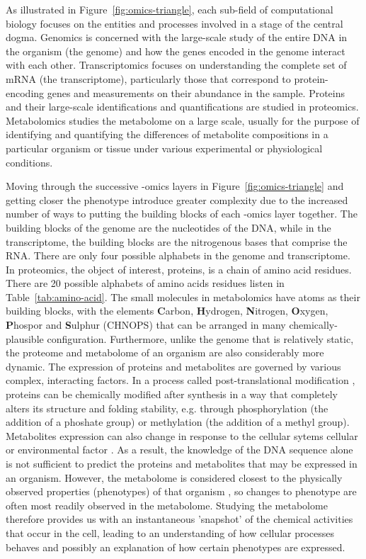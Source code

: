 As illustrated in Figure~\ref{fig:omics-triangle}, each sub-field of computational biology focuses on the entities and processes involved in a stage of the central dogma. Genomics is concerned with the large-scale study of the entire DNA in the organism (the genome) and how the genes encoded in the genome interact with each other. Transcriptomics focuses on understanding the complete set of mRNA (the transcriptome), particularly those that correspond to protein-encoding genes and measurements on their abundance in the sample. Proteins and their large-scale identifications and quantifications are studied in proteomics. Metabolomics studies the metabolome on a large scale, usually for the purpose of identifying and quantifying the differences of metabolite compositions in a particular organism or tissue under various experimental or physiological conditions. 

Moving through the successive -omics layers in Figure~\ref{fig:omics-triangle} and getting closer the phenotype introduce greater complexity due to the increased number of ways to putting the building blocks of each -omics layer together. The building blocks of the genome are the nucleotides of the DNA, while in the transcriptome, the building blocks are the nitrogenous bases that comprise the RNA. There are only four possible alphabets in the genome and transcriptome. In proteomics, the object of interest, proteins, is a chain of amino acid residues. There are 20 possible alphabets of amino acids residues listen in Table~\ref{tab:amino-acid}. The small molecules in metabolomics have atoms as their building blocks, with the elements \textbf{C}arbon, \textbf{H}ydrogen, \textbf{N}itrogen, \textbf{O}xygen, \textbf{P}hospor and \textbf{S}ulphur (CHNOPS) that can be arranged in many chemically-plausible configuration. Furthermore, unlike the genome that is relatively static, the proteome and metabolome of an organism are also considerably more dynamic. The expression of proteins and metabolites are governed by various complex, interacting factors. In a process called post-translational modification \cite{mann2003proteomic}, proteins can be chemically modified after synthesis in a way that completely alters its structure and folding stability, e.g. through phosphorylation (the addition of a phoshate group) or methylation (the addition of a methyl group). Metabolites expression can also change in response to the cellular sytems cellular \cite{Panopoulos2012} or environmental factor \cite{Hirai2004}. As a result, the knowledge of the DNA sequence alone is not sufficient to predict the proteins and metabolites that may be expressed in an organism. However, the metabolome is considered closest to the physically observed properties (phenotypes) of that organism \cite{Fiehn2002}, so changes to phenotype are often most readily observed in the metabolome. Studying the metabolome therefore provides us with an instantaneous 'snapshot' of the chemical activities that occur in the cell, leading to an understanding of how cellular processes behaves and possibly an explanation of how certain phenotypes are expressed.

